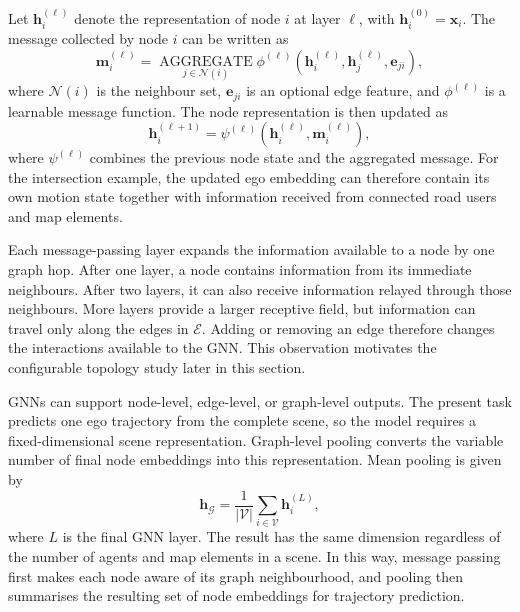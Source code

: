 Let \(\mathbf{h}^{(\ell)}_i\) denote the representation of node \(i\) at layer \(\ell\), with \(\mathbf{h}^{(0)}_i=\mathbf{x}_i\). The message collected by node \(i\) can be written as
\begin{equation}
    \mathbf{m}^{(\ell)}_i =
    \underset{j\in\mathcal{N}(i)}{\operatorname{AGGREGATE}}
    \phi^{(\ell)}\!\left(
    \mathbf{h}^{(\ell)}_i,
    \mathbf{h}^{(\ell)}_j,
    \mathbf{e}_{ji}
    \right),
    \label{eq:chapter_gnn_message}
\end{equation}
where \(\mathcal{N}(i)\) is the neighbour set, \(\mathbf{e}_{ji}\) is an optional edge feature, and \(\phi^{(\ell)}\) is a learnable message function. The node representation is then updated as
\begin{equation}
    \mathbf{h}^{(\ell+1)}_i =
    \psi^{(\ell)}\!\left(
    \mathbf{h}^{(\ell)}_i,
    \mathbf{m}^{(\ell)}_i
    \right),
    \label{eq:chapter_gnn_update}
\end{equation}
where \(\psi^{(\ell)}\) combines the previous node state and the aggregated message. For the intersection example, the updated ego embedding can therefore contain its own motion state together with information received from connected road users and map elements.

Each message-passing layer expands the information available to a node by one graph hop. After one layer, a node contains information from its immediate neighbours. After two layers, it can also receive information relayed through those neighbours. More layers provide a larger receptive field, but information can travel only along the edges in \(\mathcal{E}\). Adding or removing an edge therefore changes the interactions available to the GNN. This observation motivates the configurable topology study later in this section.

GNNs can support node-level, edge-level, or graph-level outputs. The present task predicts one ego trajectory from the complete scene, so the model requires a fixed-dimensional scene representation. Graph-level pooling converts the variable number of final node embeddings into this representation. Mean pooling is given by
\begin{equation}
    \mathbf{h}_{\mathcal{G}}=
    \frac{1}{|\mathcal{V}|}
    \sum_{i\in\mathcal{V}}\mathbf{h}^{(L)}_i,
    \label{eq:chapter_graph_pooling}
\end{equation}
where \(L\) is the final GNN layer. The result has the same dimension regardless of the number of agents and map elements in a scene. In this way, message passing first makes each node aware of its graph neighbourhood, and pooling then summarises the resulting set of node embeddings for trajectory prediction.

